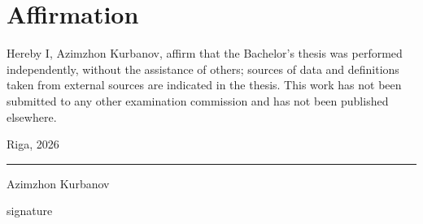 \documentclass[12pt,a4paper]{report}
\begin{document}
\chapter*{Affirmation}

Hereby I, Azimzhon Kurbanov, affirm that the Bachelor's thesis was performed independently,
without the assistance of others; sources of data and definitions taken from external sources
are indicated in the thesis. This work has not been submitted to any other examination
commission and has not been published elsewhere.

\vspace{1cm}
Riga, 2026

\vspace{1.5cm}
\noindent\rule{6cm}{0.4pt} \hfill Azimzhon Kurbanov

\noindent signature
\end{document}

